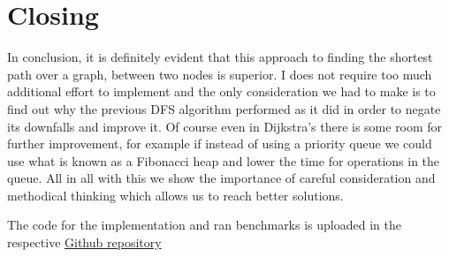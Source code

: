 \documentclass[a4paper,11pt]{article}
\begin{document}
\section*{Closing}
In conclusion, it is definitely evident that this approach to finding the shortest path over a graph, between two nodes is superior. I does not require too much additional effort to implement and the only consideration we had to make is to find out why the previous DFS algorithm performed as it did in order to negate its downfalls and improve it. Of course even in Dijkstra's there is some room for further improvement, for example if instead of using a priority queue we could use what is known as a Fibonacci heap and lower the time for operations in the queue. All in all with this we show the importance of careful consideration and methodical thinking which allows us to reach better solutions. 

The code for the implementation and ran benchmarks is uploaded in the respective \href{https://github.com/kexana/Algorithms-and-Data-Structures-ID1021}{Github repository}
\end{document}
